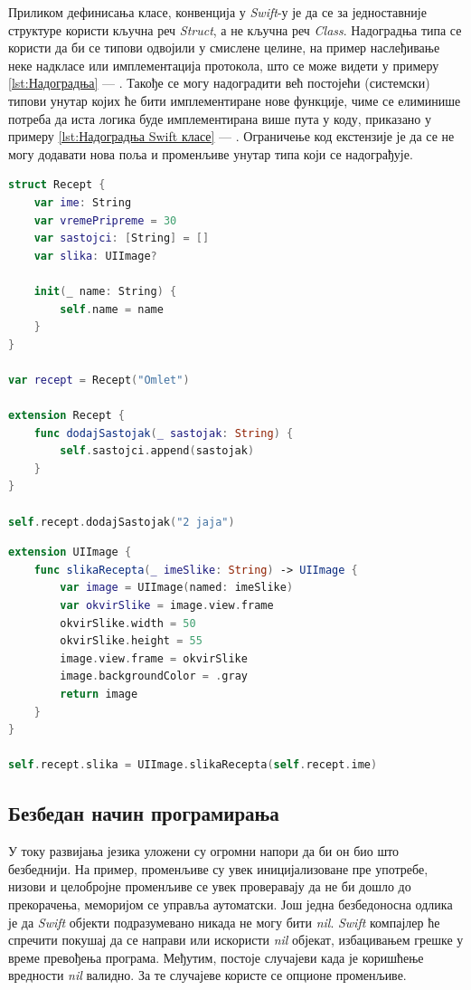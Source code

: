 \documentclass[12pt,oneside]{memoir}
\begin{document}
\indent Приликом дефинисања класе, конвенција у \textit{Swift}-у је да се за једноставније структуре користи кључна реч \textit{Struct}, а не кључна реч \textit{Class}. Надоградња типа се користи да би се типови одвојили у смислене целине, на пример наслеђивање неке надкласе или имплементација протокола, што се може видети у примеру \ref{lst:Надоградња} --- . Такође се могу надоградити већ постојећи (системски) типови унутар којих ће бити имплементиране нове функције, чиме се елиминише потреба да иста логика буде имплементирана више пута у коду, приказано у примеру \ref{lst:Надоградња Swift класе} --- . Ограничење код екстензије је да се не могу додавати нова поља и променљиве унутар типа који се надограђује.

\begin{lstlisting}[caption=\textit{{Надоградња постојећег типа (класе, структуре)}}, label={lst:Надоградња}, language=Swift, frame=single]
struct Recept {
    var ime: String
    var vremePripreme = 30
    var sastojci: [String] = []
    var slika: UIImage?

    init(_ name: String) {
        self.name = name
    }
}

var recept = Recept("Omlet")

extension Recept {
    func dodajSastojak(_ sastojak: String) {
        self.sastojci.append(sastojak)
    }
}

self.recept.dodajSastojak("2 jaja")
\end{lstlisting}

\begin{lstlisting}[caption=\textit{{Надоградња Swift класе}}, label={lst:Надоградња Swift класе}, language=Swift, frame=single]
extension UIImage {
    func slikaRecepta(_ imeSlike: String) -> UIImage {
        var image = UIImage(named: imeSlike)
        var okvirSlike = image.view.frame
        okvirSlike.width = 50
        okvirSlike.height = 55
        image.view.frame = okvirSlike
        image.backgroundColor = .gray
        return image
    }
}

self.recept.slika = UIImage.slikaRecepta(self.recept.ime)
\end{lstlisting}

\subsection{Безбедан начин програмирања}

\indent У току развијања језика уложени су огромни напори да би он био што безбеднији. На пример, променљиве су увек иницијализоване пре употребе, низови и целобројне променљиве се увек проверавају да не би дошло до прекорачења, меморијом се управља аутоматски.
Још једна безбедоносна одлика је да \textit{Swift} објекти подразумевано никада не могу бити \textit{nil}. \textit{Swift} компајлер ће спречити покушај да се направи или искористи \textit{nil} објекат, избацивањем грешке у време превођења програма.
Међутим, постоје случајеви када је коришћење вредности \textit{nil} валидно. За те случајеве користе се опционе променљиве.
\end{document}
